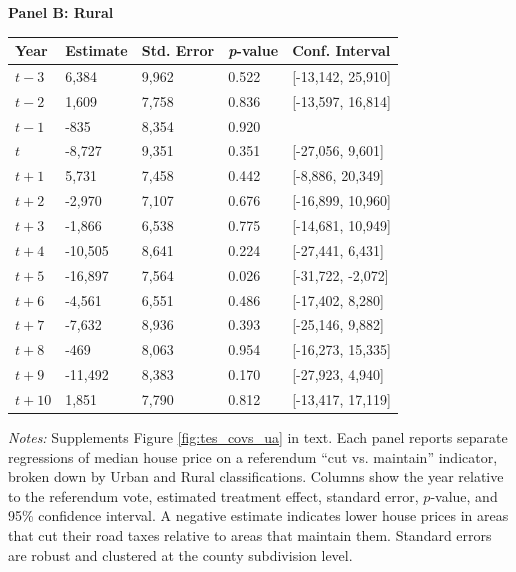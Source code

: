 \begin{table}[htbp]
\begin{threeparttable}
    \centering
    \textbf{Panel B: Rural} \\[4pt]
    \begin{tabularx}{\textwidth}{l*{4}{X}}
    \hline
    \textbf{Year} & \textbf{Estimate} & \textbf{Std. Error} & \textbf{\textit{p}-value} & \textbf{Conf. Interval} \\
    \hline
    $t - 3$  & 6,384  & 9,962  & 0.522 & [-13,142, 25,910] \\
    $t - 2$  & 1,609  & 7,758  & 0.836 & [-13,597, 16,814] \\
    $t - 1$  & -835   & 8,354  & 0.920 &  \\
    $t$  & -8,727 & 9,351  & 0.351 & [-27,056, 9,601] \\
    $t + 1$  & 5,731  & 7,458  & 0.442 & [-8,886, 20,349] \\
    $t + 2$  & -2,970 & 7,107  & 0.676 & [-16,899, 10,960] \\
    $t + 3$  & -1,866 & 6,538  & 0.775 & [-14,681, 10,949] \\
    $t + 4$  & -10,505 & 8,641 & 0.224 & [-27,441, 6,431] \\
    $t + 5$  & -16,897 & 7,564 & 0.026 & [-31,722, -2,072] \\
    $t + 6$  & -4,561 & 6,551  & 0.486 & [-17,402, 8,280] \\
    $t + 7$  & -7,632 & 8,936  & 0.393 & [-25,146, 9,882] \\
    $t + 8$  & -469   & 8,063  & 0.954 & [-16,273, 15,335] \\
    $t + 9$  & -11,492 & 8,383 & 0.170 & [-27,923, 4,940] \\
    $t + 10$ & 1,851  & 7,790  & 0.812 & [-13,417, 17,119] \\
    \hline
    \end{tabularx}
    
    \begin{tablenotes}[flushleft]
    \small
    \item \textit{Notes:} Supplements Figure \ref{fig:tes_covs_ua} in text. Each panel reports separate regressions of median house price on a referendum “cut vs. maintain” indicator, broken down by Urban and Rural classifications. Columns show the year relative to the referendum vote, estimated treatment effect, standard error, \(p\)-value, and 95\% confidence interval. A negative estimate indicates lower house prices in areas that cut their road taxes relative to areas that maintain them. Standard errors are robust and clustered at the county subdivision level.
    \end{tablenotes}
    \end{threeparttable}
\end{table}

